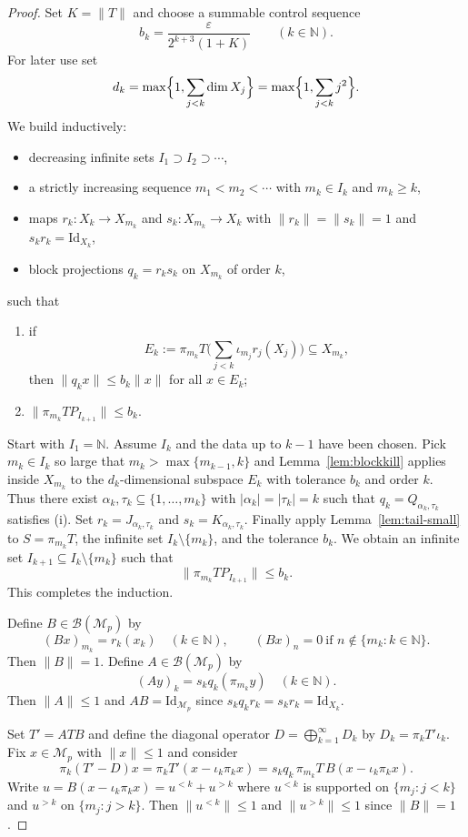 \documentclass[11pt]{amsart}
\theoremstyle{plain}
\theoremstyle{definition}
\numberwithin{equation}{section}
\newcommand{\norm}[1]{\lVert #1 \rVert}
\newcommand{\Bop}{\mathcal{B}}
\newcommand{\N}{\mathbb{N}}
\newcommand{\Id}{\mathrm{Id}}
\renewcommand{\le}{\leqslant}
\renewcommand{\ge}{\geqslant}
\begin{document}
\begin{proof}
Set $K=\norm{T}$ and choose a summable control sequence
\[
b_k=\frac{\varepsilon}{2^{k+3}(1+K)}\qquad(k\in\N).
\]
For later use set
\[
    d_k=\max\Bigl\{1,\sum_{j<k}\dim X_j\Bigr\}
       =\max\Bigl\{1,\sum_{j<k}j^2\Bigr\}.
\]
We build inductively:
\begin{itemize}
    \item decreasing infinite sets $I_1\supset I_2\supset \cdots$,
    \item a strictly increasing sequence $m_1<m_2<\cdots$ with $m_k\in I_k$ and $m_k\ge k$,
    \item maps $r_k\colon X_k\to X_{m_k}$ and $s_k\colon X_{m_k}\to X_k$ with $\norm{r_k}=\norm{s_k}=1$ and $s_k r_k=\Id_{X_k}$,
    \item block projections $q_k=r_k s_k$ on $X_{m_k}$ of order $k$,
\end{itemize}
such that
\begin{enumerate}
\item[(i)] if
\[
E_k := \pi_{m_k}T\Big(\sum_{j<k} \iota_{m_j} r_j(X_j)\Big)\subseteq X_{m_k},
\]
then $\norm{q_k x}\le b_k \norm{x}$ for all $x\in E_k$;
\item[(ii)] $\norm{\pi_{m_k} T P_{I_{k+1}}}\le b_k$.
\end{enumerate}

Start with $I_1=\N$. Assume $I_k$ and the data up to $k-1$ have been chosen.
Pick $m_k\in I_k$ so large that $m_k>\max\{m_{k-1},k\}$ and Lemma~\ref{lem:blockkill} applies inside $X_{m_k}$
to the $d_k$-dimensional subspace $E_k$ with tolerance $b_k$ and order $k$.
Thus there exist $\alpha_k,\tau_k\subseteq\{1,\dots,m_k\}$ with $|\alpha_k|=|\tau_k|=k$ such that
$q_k=Q_{\alpha_k,\tau_k}$ satisfies (i). Set $r_k=J_{\alpha_k,\tau_k}$ and $s_k=K_{\alpha_k,\tau_k}$.
Finally apply Lemma~\ref{lem:tail-small} to $S=\pi_{m_k}T$, the infinite set $I_k\setminus\{m_k\}$, and the tolerance $b_k$.  We obtain an infinite set
$I_{k+1}\subseteq I_k\setminus\{m_k\}$ such that
\[
    \|\pi_{m_k}T P_{I_{k+1}}\|\le b_k.
\]
This completes the induction.

Define $B\in\Bop(\mathcal{M}_p)$ by
\[
(Bx)_{m_k}=r_k(x_k)\quad (k\in\N),\qquad (Bx)_n=0\ \text{if }n\notin\{m_k:k\in\N\}.
\]
Then $\norm{B}=1$. Define $A\in\Bop(\mathcal{M}_p)$ by
\[
(Ay)_k = s_k q_k(\pi_{m_k}y)\quad (k\in\N).
\]
Then $\norm{A}\le 1$ and $AB=\Id_{\mathcal{M}_p}$ since $s_k q_k r_k=s_k r_k=\Id_{X_k}$.

Set $T'=ATB$ and define the diagonal operator $D=\bigoplus_{k=1}^\infty D_k$ by $D_k=\pi_k T' \iota_k$.
Fix $x\in\mathcal{M}_p$ with $\norm{x}\le 1$ and consider
\[
\pi_k(T'-D)x=\pi_kT'(x-\iota_k\pi_k x)=s_k q_k\,\pi_{m_k}T\,B(x-\iota_k\pi_k x).
\]
Write $u=B(x-\iota_k\pi_k x)=u^{<k}+u^{>k}$ where $u^{<k}$ is supported on $\{m_j:j<k\}$ and $u^{>k}$ on $\{m_j:j>k\}$.
Then $\norm{u^{<k}}\le 1$ and $\norm{u^{>k}}\le 1$ since $\norm{B}=1$.


\end{proof}
\end{document}
